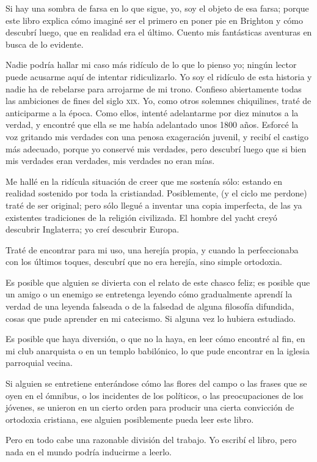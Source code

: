 Si hay una sombra de farsa en lo que sigue, yo, soy el objeto de esa farsa; porque este libro explica
cómo imaginé ser el primero en poner pie en Brighton y cómo descubrí luego, que en realidad era el
último.
Cuento mis fantásticas aventuras en busca de lo evidente.

Nadie podría hallar mi caso más ridículo de lo que lo pienso yo; ningún lector puede acusarme aquí
de intentar ridiculizarlo. Yo soy el ridículo de esta historia y nadie ha de rebelarse para arrojarme de mi
trono. Confieso abiertamente todas las ambiciones de fines del siglo \textsc{xix}. Yo, como otros solemnes
chiquilines, traté de anticiparme a la época. Como ellos, intenté adelantarme por diez minutos a la verdad,
y encontré que ella se me había adelantado unos 1800 años. Esforcé la voz gritando mis verdades con
una penosa exageración juvenil, y recibí el castigo más adecuado, porque yo conservé mis verdades, pero
descubrí luego que si bien mis verdades eran verdades, mis verdades no eran mías.

Me hallé en la ridícula situación de creer que me sostenía sólo: estando en realidad sostenido por
toda la cristiandad.
Posiblemente, (y el ciclo me perdone) traté de ser original; pero sólo llegué a inventar una copia
imperfecta, de las ya existentes tradiciones de la religión civilizada. El hombre del yacht creyó descubrir
Inglaterra; yo creí descubrir Europa.

Traté de encontrar para mi uso, una herejía propia, y cuando la perfeccionaba con los últimos
toques, descubrí que no era herejía, sino simple ortodoxia.

Es posible que alguien se divierta con el relato de este chasco feliz; es posible que un amigo o un
enemigo se entretenga leyendo cómo gradualmente aprendí la verdad de una leyenda falseada o de la
falsedad de alguna filosofía difundida, cosas que pude aprender en mi catecismo. Si alguna vez lo hubiera
estudiado.

Es posible que haya diversión, o que no la haya, en leer cómo encontré al fin, en mi club anarquista
o en un templo babilónico, lo que pude encontrar en la iglesia parroquial vecina.

Si alguien se entretiene enterándose cómo las flores del campo o las frases que se oyen en el
ómnibus, o los incidentes de los políticos, o las preocupaciones de los jóvenes, se unieron en un cierto
orden para producir una cierta convicción de ortodoxia cristiana, ese alguien posiblemente pueda leer este
libro.

Pero en todo cabe una razonable división del trabajo. Yo escribí el libro, pero nada en el mundo
podría inducirme a leerlo.

